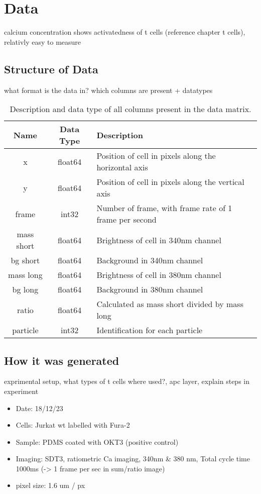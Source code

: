 \chapter{Data}
\label{chapter:data}

calcium concentration shows activatedness of t cells (reference chapter t cells), relativly easy to measure

\section{Structure of Data}

what format is the data in? which columns are present + datatypes

\begin{table}[h!]
	\centering
	\begin{tabular}{|c|c|l|}
		\hline
		\textbf{Name} & \textbf{Data Type} & \textbf{Description} \\
		\hline
		x & float64 & Position of cell in pixels along the horizontal axis \\
		\hline
		y & float64 & Position of cell in pixels along the vertical axis \\
		\hline
		frame & int32 & Number of frame, with frame rate of 1 frame per second \\
		\hline
		mass short & float64 & Brightness of cell in 340nm channel \\
		\hline
		bg short & float64 & Background in 340nm channel \\
		\hline
		mass long & float64 & Brightness of cell in 380nm channel \\
		\hline
		bg long & float64 & Background in 380nm channel \\
		\hline
		ratio & float64 & Calculated as mass short divided by mass long \\
		\hline
		particle & int32 & Identification for each particle \\
		\hline
	\end{tabular}
	\caption{Description and data type of all columns present in the data matrix.}
\end{table}


\section{How it was generated}

exprimental setup, what types of t cells where used?, apc layer, explain steps in experiment

\begin{itemize}
	\item Date: 18/12/23
	\item Cells:  Jurkat wt labelled with Fura-2
	\item Sample: PDMS coated with OKT3 (positive control)
	\item Imaging: SDT3, ratiometric Ca imaging, 340nm \& 380 nm, Total cycle time 1000ms (-> 1 frame per sec in sum/ratio image)
	\item pixel size: 1.6 um / px
\end{itemize}

